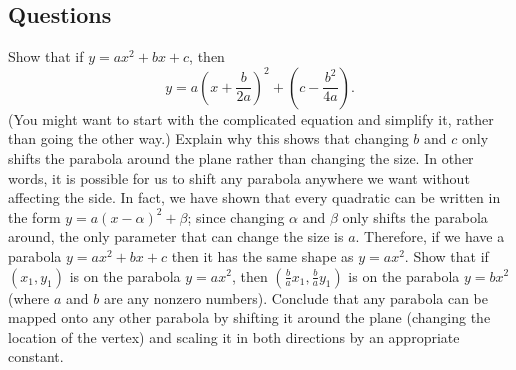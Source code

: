 \subsection*{Questions}
\begin{questions}
  \question Show that if $ y = ax^2 + bx + c $, then
    \begin{displaymath}
      y = a\left(x + \frac{b}{2a}\right)^2 + \left(c - \frac{b^2}{4a}\right).
    \end{displaymath}
    (You might want to start with the complicated equation and simplify it, rather than going the other way.)
  \question Explain why this shows that changing $ b $ and $ c $ only shifts the parabola around the plane rather than changing the size. In other
            words, it is possible for us to shift any parabola anywhere we want without affecting the side.
  \question In fact, we have shown that every quadratic can be written in the form $ y = a(x - \alpha)^2 + \beta $; since changing $ \alpha $
            and $ \beta $ only shifts the parabola around, the only parameter that can change the size is $ a $. Therefore, if
            we have a parabola $ y = ax^2 + bx + c $ then it has the same shape as $ y = ax^2 $. Show that if $ (x_1,y_1) $ is on the
            parabola $ y = ax^2 $, then $ (\frac{b}{a}x_1, \frac{b}{a}y_1) $ is on the parabola $ y = bx^2 $ (where $ a $ and $ b $ are any
            nonzero numbers).
  \question Conclude that any parabola can be mapped onto any other parabola by shifting it around the plane (changing the location of the vertex)
            and scaling it in both directions by an appropriate constant.
\end{questions}


